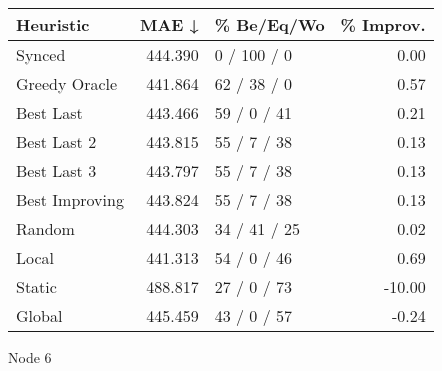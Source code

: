 \begin{tabular}{lrlr}
\toprule
\textbf{Heuristic} & \textbf{MAE ↓} & \textbf{\% Be/Eq/Wo} & \textbf{\% Improv.} \\
\midrule
            Synced &        444.390 &          0 / 100 / 0 &                0.00 \\
     Greedy Oracle &        441.864 &          62 / 38 / 0 &                0.57 \\
         Best Last &        443.466 &          59 / 0 / 41 &                0.21 \\
       Best Last 2 &        443.815 &          55 / 7 / 38 &                0.13 \\
       Best Last 3 &        443.797 &          55 / 7 / 38 &                0.13 \\
    Best Improving &        443.824 &          55 / 7 / 38 &                0.13 \\
            Random &        444.303 &         34 / 41 / 25 &                0.02 \\
             Local &        441.313 &          54 / 0 / 46 &                0.69 \\
            Static &        488.817 &          27 / 0 / 73 &              -10.00 \\
            Global &        445.459 &          43 / 0 / 57 &               -0.24 \\
\bottomrule
\end{tabular}
\caption{Node 6}
\label{tab:non_lr01_le2_bs2_6}
